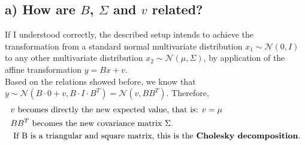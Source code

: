 \documentclass[11pt]{scrartcl} %
\begin{document}
         \subsection*{a) How are \(B\), \(\Sigma\) and \(v\) related?}
         If I understood correctly, the described setup intends to achieve the transformation from a standard normal multivariate distribution \(x_1\sim\mathcal{N}(0, I)\) to any other multivariate distribution \(x_2\sim\mathcal{N}(\mu, \Sigma)\), by application of the affine transformation \(y=Bx+v\).\\
         Based on the relations showed before, we know that \(y\sim\mathcal{N}(B\cdot 0 +v, B\cdot I \cdot B^T) = \mathcal{N}(v, BB^T)\). Therefore,
         \begin{align*}
           \begin{split}
             &v\text{ becomes directly the new expected value, that is: }v=\mu\\
             &BB^T\text{ becomes the new covariance matrix }\Sigma.\\
             &\text{ If B is a triangular and square matrix, this is the \textbf{Cholesky decomposition}.}
           \end{split}
         \end{align*}
\end{document}
